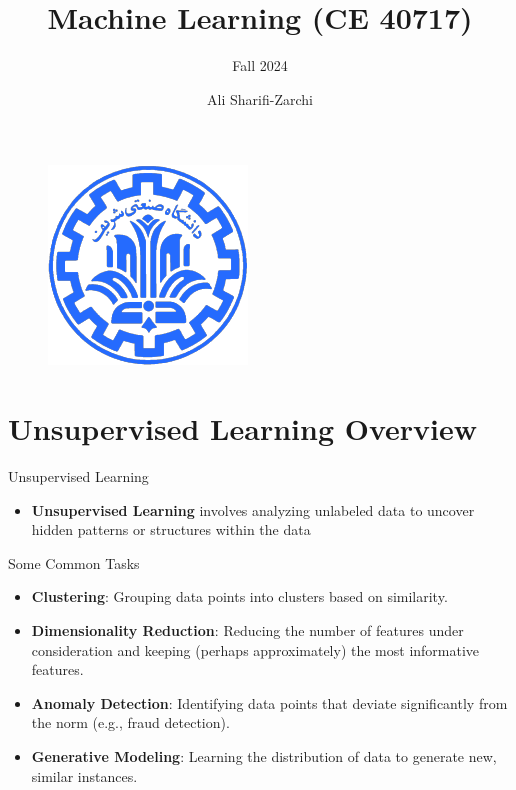 \documentclass[serif, aspectratio=169]{beamer}
\author{Ali Sharifi-Zarchi}
\title{Machine Learning (CE 40717)}
\subtitle{Fall 2024}
\institute{
    CE Department \\
    Sharif University of Technology
}
\begin{document}
\begin{frame}
    \titlepage
    \vspace*{-0.6cm}
    \begin{figure}[htpb]
        \begin{center}
            \includegraphics[keepaspectratio, scale=0.25]{pic/sharif-main-logo.png}
        \end{center}
    \end{figure}
\end{frame}

\begin{frame}    
\tableofcontents[sectionstyle=show,
subsectionstyle=show/shaded/hide,
subsubsectionstyle=show/shaded/hide]
\end{frame}

\section{Unsupervised Learning Overview}
\begin{frame}{Unsupervised Learning}
    
    \begin{itemize}
        \item\textbf{Unsupervised Learning} involves analyzing unlabeled data to uncover hidden patterns or structures within the data
    \end{itemize}
\end{frame}

\begin{frame}{Some Common Tasks}
        \begin{itemize}
            \item \textbf{Clustering}: Grouping data points into clusters based on similarity.
            \item \textbf{Dimensionality Reduction}: Reducing the number of features under consideration and keeping (perhaps approximately) the most informative features.
            
        \item \textbf{Anomaly Detection}: Identifying data points that deviate significantly from the norm (e.g., fraud detection).

    \item \textbf{Generative Modeling}: Learning the distribution of data to generate new, similar instances.
        \end{itemize}
\end{frame}
\end{document}
